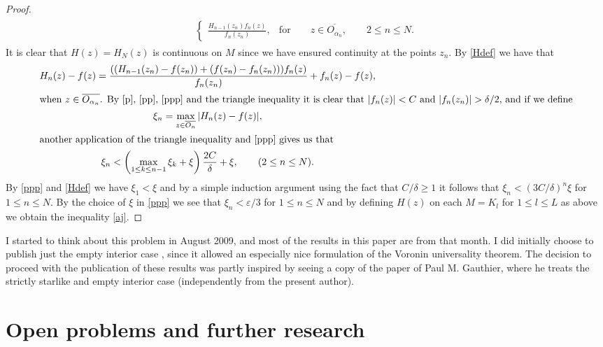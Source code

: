 \documentclass[11pt]{article}
\begin{document}
\begin{proof}
\begin{gather}
\begin{split}
\begin{cases}
    \frac{H_{n-1}(z_n) f_n(z)}{f_{n}(z_n)},  & \text{for}   \qquad z \in \overline{O_{\alpha_n}}, \qquad 2 \leq n \leq N.
 \end{cases}
\end{split}
\end{gather}
It is clear that $H(z)=H_N(z)$ is continuous on $M$ since we have ensured continuity at the points $z_n$. By \eqref{Hdef} we have that
\begin{gather*}
  H_n(z)-f(z)
  =\frac{((H_{n-1}(z_n)-f(z_n))+(f(z_n)-f_n(z_n)))f_n(z)}{f_n(z_n)} + f_{n}(z)-f(z), \\ 
\intertext{when $z \in \overline{O_{\alpha_n}}$. By \eqref{p}, \eqref{pp}, \eqref{ppp} and the triangle inequality it is clear that $|f_n(z)|<C$ and $|f_n(z_n)|>\delta/2$, and if we define} 
\xi_n=  \max_{z \in \overline{O_{n}}} \abs{H_n(z)-f(z)},  \\ \intertext{another application of the triangle inequality and \eqref{ppp} gives us that}
  \xi_n <  \left( \max_{1\leq k \leq n-1}\xi_{k}+\xi \right) \frac{2C} {\delta} +\xi, \qquad (2 \leq n \leq N). 
\end{gather*}
By \eqref{ppp} and \eqref{Hdef} we have $\xi_1 < \xi$ and by a simple induction argument using the fact that $C/\delta \geq 1$ it follows that $\xi_n < (3C/\delta)^n \xi$ for $1 \leq n \leq N$. By the choice of $\xi$ in \eqref{ppp} we see that $\xi_n < \varepsilon/3$ for $1 \leq n \leq N$ and by defining $H(z)$ on each $M=K_l$ for $1 \leq l \leq L$ as above we obtain the inequality \eqref{aj}.  \end{proof}


\begin{rem}
 I started to think about this problem in August 2009, and most of the results in this paper are from that month. I did initially choose to publish just the empty interior case \cite{Andersson}, since it allowed an especially nice formulation of the Voronin universality theorem. The decision to proceed with the publication of these results  was partly inspired by seeing a copy of the paper  \cite{Gauthier} of Paul M. Gauthier, where he treats the strictly starlike and empty interior case (independently from the present author). 
\end{rem}






\section{Open problems and further research}
\end{document}
